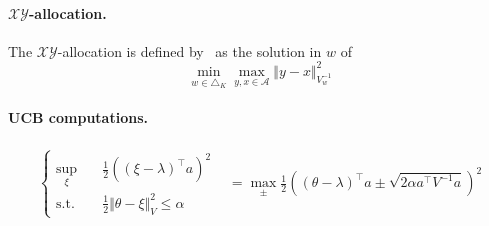 \paragraph{$\mathcal X \mathcal Y$-allocation.}

The $\mathcal X \mathcal Y$-allocation is defined by~\citet{soare2014linear} as the solution in $w$ of
 \[
\min_{w \in \triangle_K} \max_{y,x \in \mathcal A} \Vert y-x \Vert^2_{V_w^{-1}}
 \]

\paragraph{UCB computations.}

\begin{align*}
\left\{\begin{array}{ll}
\sup_\xi \quad &  \frac{1}{2} ((\xi - \lambda)^\top a)^2
\\
\text{s.t.} \quad & \frac{1}{2} \Vert \theta - \xi \Vert^2_V \le \alpha 
\end{array}\right.
&= \max_\pm\frac{1}{2} \left( (\theta - \lambda)^\top a \pm \sqrt{2 \alpha a^\top V^{-1} a} \right)^2
\end{align*}
